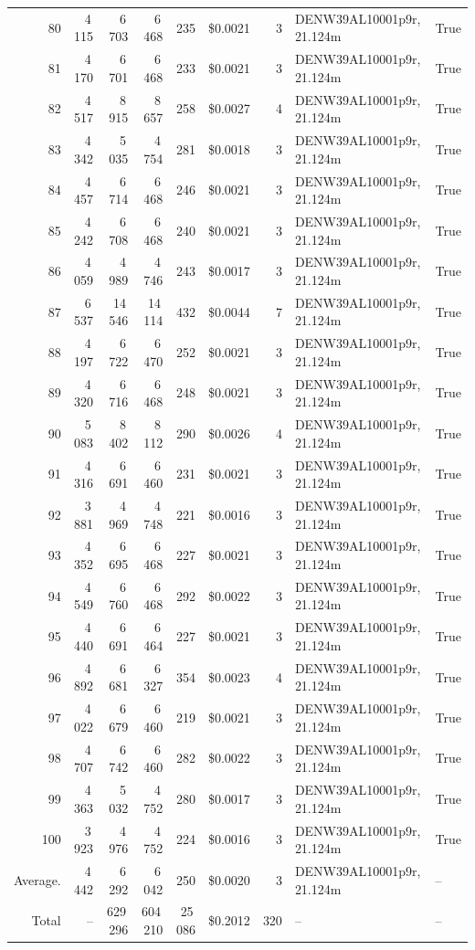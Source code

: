 \documentclass[a4paper,11pt]{article}
\begin{document}
\begin{table}[ht]
\begin{tabular}{r r r r r r r p{3cm} l}
80 & 4\,115 & 6\,703 & 6\,468 & 235 & \$0.0021 & 3 & DENW39AL10001p9r, 21.124m & True \\
81 & 4\,170 & 6\,701 & 6\,468 & 233 & \$0.0021 & 3 & DENW39AL10001p9r, 21.124m & True \\
82 & 4\,517 & 8\,915 & 8\,657 & 258 & \$0.0027 & 4 & DENW39AL10001p9r, 21.124m & True \\
83 & 4\,342 & 5\,035 & 4\,754 & 281 & \$0.0018 & 3 & DENW39AL10001p9r, 21.124m & True \\
84 & 4\,457 & 6\,714 & 6\,468 & 246 & \$0.0021 & 3 & DENW39AL10001p9r, 21.124m & True \\
85 & 4\,242 & 6\,708 & 6\,468 & 240 & \$0.0021 & 3 & DENW39AL10001p9r, 21.124m & True \\
86 & 4\,059 & 4\,989 & 4\,746 & 243 & \$0.0017 & 3 & DENW39AL10001p9r, 21.124m & True \\
87 & 6\,537 & 14\,546 & 14\,114 & 432 & \$0.0044 & 7 & DENW39AL10001p9r, 21.124m & True \\
88 & 4\,197 & 6\,722 & 6\,470 & 252 & \$0.0021 & 3 & DENW39AL10001p9r, 21.124m & True \\
89 & 4\,320 & 6\,716 & 6\,468 & 248 & \$0.0021 & 3 & DENW39AL10001p9r, 21.124m & True \\
90 & 5\,083 & 8\,402 & 8\,112 & 290 & \$0.0026 & 4 & DENW39AL10001p9r, 21.124m & True \\
91 & 4\,316 & 6\,691 & 6\,460 & 231 & \$0.0021 & 3 & DENW39AL10001p9r, 21.124m & True \\
92 & 3\,881 & 4\,969 & 4\,748 & 221 & \$0.0016 & 3 & DENW39AL10001p9r, 21.124m & True \\
93 & 4\,352 & 6\,695 & 6\,468 & 227 & \$0.0021 & 3 & DENW39AL10001p9r, 21.124m & True \\
94 & 4\,549 & 6\,760 & 6\,468 & 292 & \$0.0022 & 3 & DENW39AL10001p9r, 21.124m & True \\
95 & 4\,440 & 6\,691 & 6\,464 & 227 & \$0.0021 & 3 & DENW39AL10001p9r, 21.124m & True \\
96 & 4\,892 & 6\,681 & 6\,327 & 354 & \$0.0023 & 4 & DENW39AL10001p9r, 21.124m & True \\
97 & 4\,022 & 6\,679 & 6\,460 & 219 & \$0.0021 & 3 & DENW39AL10001p9r, 21.124m & True \\
98 & 4\,707 & 6\,742 & 6\,460 & 282 & \$0.0022 & 3 & DENW39AL10001p9r, 21.124m & True \\
99 & 4\,363 & 5\,032 & 4\,752 & 280 & \$0.0017 & 3 & DENW39AL10001p9r, 21.124m & True \\
100 & 3\,923 & 4\,976 & 4\,752 & 224 & \$0.0016 & 3 & DENW39AL10001p9r, 21.124m & True \\
\hline
Average. & 4\,442 & 6\,292 & 6\,042 & 250 & \$0.0020 & 3 & DENW39AL10001p9r, 21.124m & -- \\
Total & -- & 629\,296 & 604\,210 & 25\,086 & \$0.2012 & 320 & -- & -- \\
\hline
\end{tabular}
\end{table}
\end{document}

